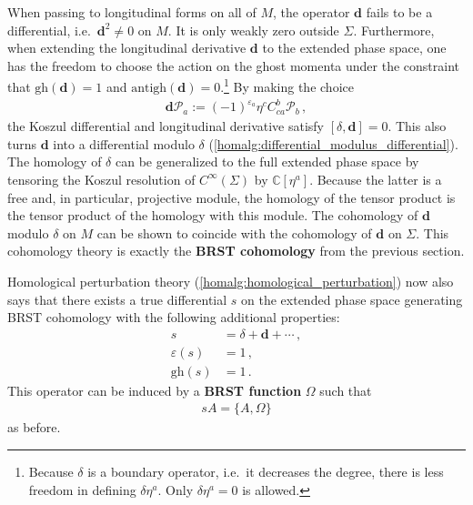     When passing to longitudinal forms on all of $M$, the operator $\mathbf{d}$ fails to be a differential, i.e.~$\mathbf{d}^2\neq0$ on $M$. It is only weakly zero outside $\Sigma$. Furthermore, when extending the longitudinal derivative $\mathbf{d}$ to the extended phase space, one has the freedom to choose the action on the ghost momenta under the constraint that $\mathrm{gh}(\mathbf{d})=1$ and $\mathrm{antigh}(\mathbf{d})=0$.\footnote{Because $\delta$ is a boundary operator, i.e.~it decreases the degree, there is less freedom in defining $\delta\eta^a$. Only $\delta\eta^a=0$ is allowed.} By making the choice
    \begin{gather}
        \mathbf{d}\mathcal{P}_a := (-1)^{\varepsilon_a}\eta^c C^b_{ca}\mathcal{P}_b\,,
    \end{gather}
    the Koszul differential and longitudinal derivative satisfy $[\delta,\mathbf{d}]=0$. This also turns $\mathbf{d}$ into a differential modulo $\delta$ (\cref{homalg:differential_modulus_differential}). The homology of $\delta$ can be generalized to the full extended phase space by tensoring the Koszul resolution of $C^\infty(\Sigma)$ by $\mathbb{C}[\eta^a]$. Because the latter is a free and, in particular, projective module, the homology of the tensor product is the tensor product of the homology with this module. The cohomology of $\mathbf{d}$ modulo $\delta$ on $M$ can be shown to coincide with the cohomology of $\mathbf{d}$ on $\Sigma$. This cohomology theory is exactly the \textbf{BRST cohomology} from the previous section.

    Homological perturbation theory (\cref{homalg:homological_perturbation}) now also says that there exists a true differential $s$ on the extended phase space  generating BRST cohomology with the following additional properties:
    \begin{align}
        s &= \delta + \mathbf{d} + \cdots\,,\nonumber\\
        \varepsilon(s) &= 1\,,\\
        \mathrm{gh}(s) &= 1\,.\nonumber
    \end{align}
    This operator can be induced by a \textbf{BRST function} $\Omega$ such that
    \begin{gather}
        sA = \{A,\Omega\}
    \end{gather}
    as before.

